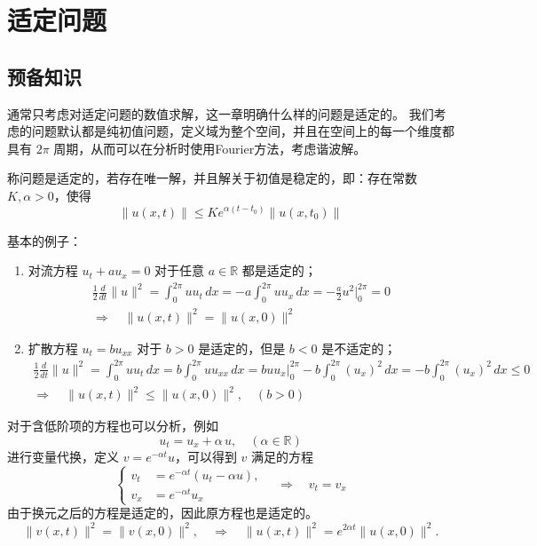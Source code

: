 \chapter{适定问题}

\section{预备知识}

通常只考虑对适定问题的数值求解，这一章明确什么样的问题是适定的。
我们考虑的问题默认都是纯初值问题，定义域为整个空间，并且在空间上的每一个维度都具有 $2\pi$ 周期，从而可以在分析时使用Fourier方法，考虑谐波解。

\begin{definition}
    称问题是适定的，若存在唯一解，并且解关于初值是稳定的，即：存在常数 $K,\alpha>0$，使得
    \[
        \| u(x,t) \| \le Ke^{\alpha(t-t_0)} \| u(x,t_0) \|
    \]
\end{definition}

基本的例子：
\begin{enumerate}
    \item 对流方程 $u_t + a u_x = 0$ 对于任意 $a \in \mathbb{R}$ 都是适定的；
          \begin{gather*}
              \frac12 \frac{d}{dt} \| u \|^2 = \int_{0}^{2\pi} u u_t \,dx = - a \int_0^{2\pi} u u_x\,dx
              = - \frac{a}2 u^2\big|_0^{2\pi} = 0
              \\
              \Rightarrow \quad \| u(x,t) \|^2 = \| u(x,0) \|^2
          \end{gather*}
    \item 扩散方程 $u_t = b u_{xx}$ 对于 $b > 0$ 是适定的，但是 $b < 0$ 是不适定的；
          \begin{gather*}
              \frac12 \frac{d}{dt} \| u \|^2 = \int_{0}^{2\pi} u u_t \,dx = b \int_0^{2\pi} u u_{xx}\,dx
              = b u u_x \big|_0^{2\pi} - b \int_{0}^{2\pi} (u_x)^2\,dx = - b \int_{0}^{2\pi} (u_x)^2\,dx \le 0
              \\
              \Rightarrow \quad \| u(x,t) \|^2 \le \| u(x,0) \|^2, \quad (b > 0)
          \end{gather*}
\end{enumerate}
对于含低阶项的方程也可以分析，例如
\[
    u_t = u_x + \alpha\,u, \quad (\alpha \in \mathbb{R})
\]
进行变量代换，定义 $v = e^{-\alpha t} u$，可以得到 $v$ 满足的方程
\[
    \left\{
    \begin{aligned}
        v_t & = e^{-\alpha t} (u_t - \alpha u), \\
        v_x & = e^{-\alpha t} u_x
    \end{aligned}
    \right.
    \quad \Rightarrow \quad v_t = v_x
\]
由于换元之后的方程是适定的，因此原方程也是适定的。
\[
    \| v(x,t) \|^2 = \| v(x,0) \|^2, \quad \Rightarrow \quad \| u(x,t) \|^2 = e^{2 \alpha t} \| u(x,0) \|^2.
\]


